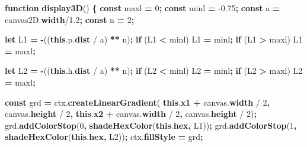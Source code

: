 \documentclass[11pt,french,a4paper,]{article}
\newenvironment{Shaded}{\begin{snugshade}}{\end{snugshade}}
\newcommand{\AttributeTok}[1]{\textcolor[rgb]{0.00,0.36,0.77}{\textbf{#1}}}
\newcommand{\ControlFlowTok}[1]{\textcolor[rgb]{0.68,0.35,0.62}{\textbf{#1}}}
\newcommand{\DecValTok}[1]{\textcolor[rgb]{0.00,0.00,0.81}{#1}}
\newcommand{\FloatTok}[1]{\textcolor[rgb]{0.00,0.00,0.81}{#1}}
\newcommand{\KeywordTok}[1]{\textcolor[rgb]{0.68,0.35,0.62}{\textbf{#1}}}
\newcommand{\NormalTok}[1]{#1}
\newcommand{\OperatorTok}[1]{\textcolor[rgb]{0.81,0.36,0.00}{\textbf{#1}}}
\newcommand{\VariableTok}[1]{\textcolor[rgb]{0.90,0.33,0.00}{#1}}
\begin{document}
\begin{Shaded}
\begin{Highlighting}[]
\KeywordTok{function} \AttributeTok{display3D}\NormalTok{() }\OperatorTok{\{}
    \KeywordTok{const}\NormalTok{ maxl }\OperatorTok{=} \DecValTok{0}\OperatorTok{;}
    \KeywordTok{const}\NormalTok{ minl }\OperatorTok{=} \FloatTok{-0.75}\OperatorTok{;}
    \KeywordTok{const}\NormalTok{ a }\OperatorTok{=} \VariableTok{canvas2D}\NormalTok{.}\AttributeTok{width}\NormalTok{/}\FloatTok{1.2}\OperatorTok{;}
    \KeywordTok{const}\NormalTok{ n }\OperatorTok{=} \DecValTok{2}\OperatorTok{;}

    \KeywordTok{let}\NormalTok{ L1 }\OperatorTok{=} \OperatorTok{-}\NormalTok{((}\KeywordTok{this}\NormalTok{.}\VariableTok{p}\NormalTok{.}\AttributeTok{dist}\NormalTok{ / a) }\OperatorTok{**}\NormalTok{ n)}\OperatorTok{;}
    \ControlFlowTok{if}\NormalTok{ (L1 }\OperatorTok{<}\NormalTok{ minl) L1 }\OperatorTok{=}\NormalTok{ minl}\OperatorTok{;}
    \ControlFlowTok{if}\NormalTok{ (L1 }\OperatorTok{>}\NormalTok{ maxl) L1 }\OperatorTok{=}\NormalTok{ maxl}\OperatorTok{;}

    \KeywordTok{let}\NormalTok{ L2 }\OperatorTok{=} \OperatorTok{-}\NormalTok{((}\KeywordTok{this}\NormalTok{.}\VariableTok{h}\NormalTok{.}\AttributeTok{dist}\NormalTok{ / a) }\OperatorTok{**}\NormalTok{ n)}\OperatorTok{;}
    \ControlFlowTok{if}\NormalTok{ (L2 }\OperatorTok{<}\NormalTok{ minl) L2 }\OperatorTok{=}\NormalTok{ minl}\OperatorTok{;}
    \ControlFlowTok{if}\NormalTok{ (L2 }\OperatorTok{>}\NormalTok{ maxl) L2 }\OperatorTok{=}\NormalTok{ maxl}\OperatorTok{;}

    \KeywordTok{const}\NormalTok{ grd }\OperatorTok{=} \VariableTok{ctx}\NormalTok{.}\AttributeTok{createLinearGradient}\NormalTok{(}
                \KeywordTok{this}\NormalTok{.}\AttributeTok{x1} \OperatorTok{+} \VariableTok{canvas}\NormalTok{.}\AttributeTok{width}\NormalTok{ / }\DecValTok{2}\OperatorTok{,} \VariableTok{canvas}\NormalTok{.}\AttributeTok{height}\NormalTok{ / }\DecValTok{2}\OperatorTok{,}
                \KeywordTok{this}\NormalTok{.}\AttributeTok{x2} \OperatorTok{+} \VariableTok{canvas}\NormalTok{.}\AttributeTok{width}\NormalTok{ / }\DecValTok{2}\OperatorTok{,} \VariableTok{canvas}\NormalTok{.}\AttributeTok{height}\NormalTok{ / }\DecValTok{2}\NormalTok{)}\OperatorTok{;}
    \VariableTok{grd}\NormalTok{.}\AttributeTok{addColorStop}\NormalTok{(}\DecValTok{0}\OperatorTok{,} \AttributeTok{shadeHexColor}\NormalTok{(}\KeywordTok{this}\NormalTok{.}\AttributeTok{hex}\OperatorTok{,}\NormalTok{ L1))}\OperatorTok{;}
    \VariableTok{grd}\NormalTok{.}\AttributeTok{addColorStop}\NormalTok{(}\DecValTok{1}\OperatorTok{,} \AttributeTok{shadeHexColor}\NormalTok{(}\KeywordTok{this}\NormalTok{.}\AttributeTok{hex}\OperatorTok{,}\NormalTok{ L2))}\OperatorTok{;}
    \VariableTok{ctx}\NormalTok{.}\AttributeTok{fillStyle} \OperatorTok{=}\NormalTok{ grd}\OperatorTok{;}


\end{Highlighting}
\end{Shaded}
\end{document}
